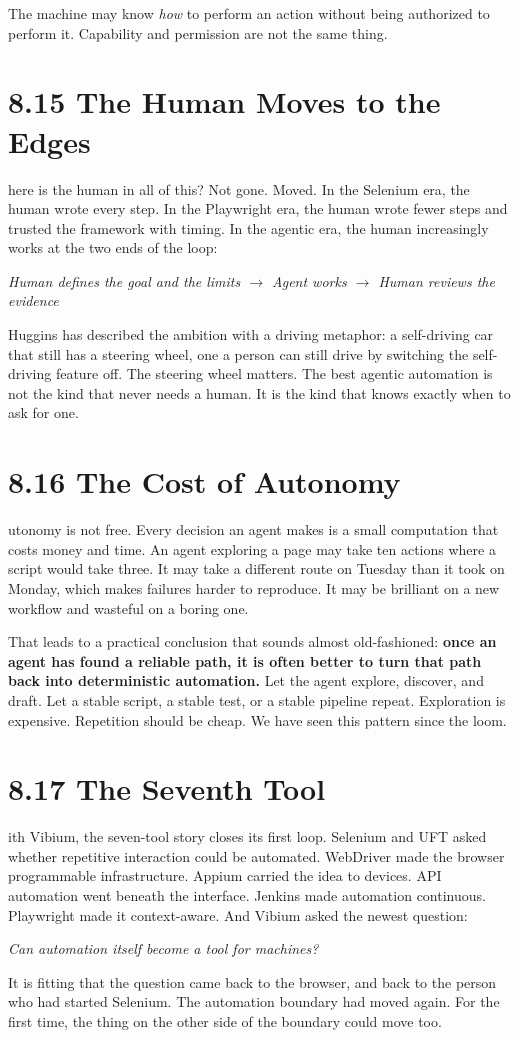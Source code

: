 \documentclass[11pt, a4paper, openany]{book}
\newcommand{\initialcap}[1]{{\fontfamily{lmss}\selectfont\huge\textbf{#1}}}
\begin{document}
The machine may know \textit{how} to perform an action without being authorized to perform it. Capability and permission are not the same thing.

\section{8.15 The Human Moves to the Edges}
\noindent \initialcap{W}here is the human in all of this? Not gone. Moved. In the Selenium era, the human wrote every step. In the Playwright era, the human wrote fewer steps and trusted the framework with timing. In the agentic era, the human increasingly works at the two ends of the loop:
\begin{center}
\textit{Human defines the goal and the limits $\rightarrow$ Agent works $\rightarrow$ Human reviews the evidence}
\end{center}
Huggins has described the ambition with a driving metaphor: a self-driving car that still has a steering wheel, one a person can still drive by switching the self-driving feature off. The steering wheel matters. The best agentic automation is not the kind that never needs a human. It is the kind that knows exactly when to ask for one.

\section{8.16 The Cost of Autonomy}
\noindent \initialcap{A}utonomy is not free. Every decision an agent makes is a small computation that costs money and time. An agent exploring a page may take ten actions where a script would take three. It may take a different route on Tuesday than it took on Monday, which makes failures harder to reproduce. It may be brilliant on a new workflow and wasteful on a boring one.

That leads to a practical conclusion that sounds almost old-fashioned: \textbf{once an agent has found a reliable path, it is often better to turn that path back into deterministic automation.} Let the agent explore, discover, and draft. Let a stable script, a stable test, or a stable pipeline repeat. Exploration is expensive. Repetition should be cheap. We have seen this pattern since the loom.

\section{8.17 The Seventh Tool}
\noindent \initialcap{W}ith Vibium, the seven-tool story closes its first loop. Selenium and UFT asked whether repetitive interaction could be automated. WebDriver made the browser programmable infrastructure. Appium carried the idea to devices. API automation went beneath the interface. Jenkins made automation continuous. Playwright made it context-aware. And Vibium asked the newest question:
\begin{center}
\textit{Can automation itself become a tool for machines?}
\end{center}
It is fitting that the question came back to the browser, and back to the person who had started Selenium. The automation boundary had moved again. For the first time, the thing on the other side of the boundary could move too.
\end{document}
